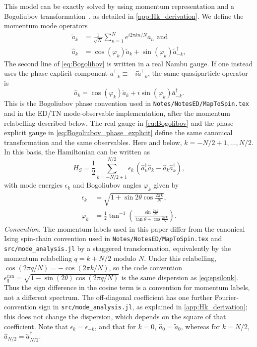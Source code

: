 \documentclass[aps,prx,twocolumn,superscriptaddress,nofootinbib,nolongbibliography,nobalancelastpage,10pt,floatfix]{revtex4-2}
\begin{document}
This model can be exactly solved by using momentum representation and a Bogoliubov transformation~\cite{Sachdev2011Quantum}, as detailed in \cref{app:Hk_derivation}. We define the momentum mode operators
\begin{align}
    \tilde{a}_k &= \frac{1}{\sqrt{N}}\sum_{n=1}^N e^{i 2\pi k n/N} a_n \mbox{ and }\nonumber\\
    \hat{a}_k   &= \cos(\varphi_k) \tilde{a}_k + \sin(\varphi_k) \tilde{a}_{-k}^\dagger,
    \label{eq:Bogolibov}
\end{align}
The second line of \cref{eq:Bogolibov} is written in a real Nambu gauge. If
one instead uses the phase-explicit component
$\bar{a}_{-k}^\dagger \equiv -i\tilde{a}_{-k}^\dagger$, the same
quasiparticle operator is
\begin{equation}
    \hat{a}_k =
    \cos(\varphi_k)\tilde{a}_k
    + i\sin(\varphi_k)\bar{a}_{-k}^\dagger .
    \label{eq:Bogoliubov_phase_explicit}
\end{equation}
This is the Bogoliubov phase convention used in
\texttt{Notes/NotesED/MapToSpin.tex} and in the ED/TN mode-observable
implementation, after the momentum relabelling described below. The real gauge
in \cref{eq:Bogolibov} and the phase-explicit gauge in
\cref{eq:Bogoliubov_phase_explicit} define the same canonical transformation
and the same observables.
Here and below, $k=-N/2+1,\ldots,N/2$. In this basis, the Hamiltonian can be written as
\begin{equation}
    H_S = \frac{1}{2} \sum_{k=-N/2+1}^{N/2} \epsilon_k\,(\hat{a}^\dagger_k \hat{a}_k-\hat{a}_k \hat{a}_k^\dagger),
    \label{eq:Hs}
\end{equation}
with mode energies $\epsilon_k$ and Bogoliubov angles $\varphi_k$ given by
\begin{align}
    \epsilon_k &= \sqrt{1 + \sin2\theta \cos\tfrac{2\pi k}{N}},\label{eq:epsilonk}\\
    \varphi_k  &= \frac{1}{2}\tan^{-1}\left(\frac{\sin\tfrac{2\pi k}{N}}{\tan\theta + \cos\tfrac{2\pi k}{N}}\right).
    \label{eq:varphik}
\end{align}
\emph{Convention.}
The momentum labels used in this paper differ from the canonical Ising
spin-chain convention used in \texttt{Notes/NotesED/MapToSpin.tex} and
\texttt{src/mode\_analysis.jl} by a staggered transformation, equivalently by the
momentum relabelling $q=k+N/2$ modulo $N$. Under this relabelling,
$\cos(2\pi q/N)=-\cos(2\pi k/N)$, so the code convention
$\epsilon^{\mathrm{can}}_q=\sqrt{1-\sin(2\theta)\cos(2\pi q/N)}$
is the same dispersion as \cref{eq:epsilonk}. Thus the sign difference in the
cosine term is a convention for momentum labels, not a different spectrum.
The off-diagonal coefficient has one further Fourier-convention sign in
\texttt{src/mode\_analysis.jl}, as explained in \cref{app:Hk_derivation}; this
does not change the dispersion, which depends on the square of that coefficient.
Note that $\epsilon_k=\epsilon_{-k}$, and that for $k=0$, $\hat{a}_0=\tilde{a}_0$, whereas for $k=N/2$, $\hat{a}_{N/2}=\tilde{a}_{N/2}^\dagger$.
\end{document}
